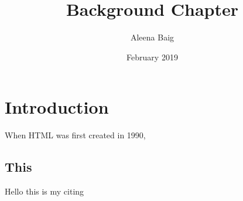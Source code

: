 \documentclass{article}
\title{Background Chapter}
\author{Aleena Baig }
\date{February 2019}
\begin{document}
\maketitle

\section{Introduction}
When HTML was first created in 1990, 


\subsection{This}
Hello this is my citing \cite{collier2004greed}
\blindtext


\newpage

\printbibliography
\end{document}

